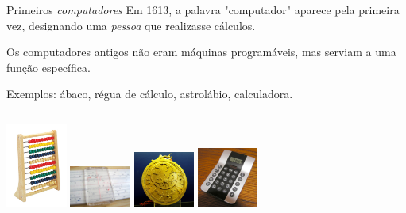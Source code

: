 \documentclass[hyperref={pdfpagelabels=false}]{beamer}
\begin{document}
\begin{frame}{Primeiros \emph{computadores}}
  Em 1613, a palavra "computador" aparece pela primeira vez, designando uma \emph{pessoa} que realizasse cálculos.
  
  Os computadores antigos não eram máquinas programáveis, mas serviam a uma função específica. 
  
  Exemplos: ábaco, régua de cálculo, astrolábio, calculadora.
  \vfill
  \begin{columns}
    \column{2cm}
    \includegraphics[width=2cm]{img/abaco.jpg}
    \column{2cm}
    \includegraphics[width=2cm]{img/regua_de_calculo.jpg}
    \column{2cm}
    \includegraphics[width=2cm]{img/astrolabio.jpg}
    \column{2cm}
    \includegraphics[width=2cm]{img/calculadora.jpg}
  \end{columns}
\end{frame}
\end{document}
